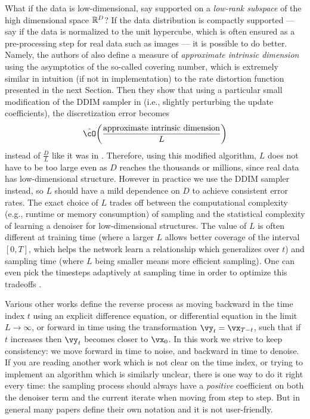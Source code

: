 \documentclass[../../book-main.tex]{subfiles}
\begin{document}
\begin{remark}
	What if the data is low-dimensional, say supported on a \textit{low-rank subspace} of the high dimensional space \(\mathbb{R}^{D}\)? If the data distribution is compactly supported --- say if the data is normalized to the unit hypercube, which is often ensured as a pre-processing step for real data such as images --- it is possible to do better. Namely, the authors of \cite{li2024d} also define a measure of \textit{approximate intrinsic dimension} using the asymptotics of the so-called covering number, which is extremely similar in intuition (if not in implementation) to the rate distortion function presented in the next Section. Then they show that using a particular small modification of the DDIM sampler in  (i.e., slightly perturbing the update coefficients), the discretization error becomes
	\begin{equation}
		\tilde{\cO}\rp{\frac{\text{approximate intrinsic dimension}}{L}}
	\end{equation}
	instead of \(\frac{D}{L}\) like it was in . Therefore, using this modified algorithm, \(L\) does not have to be too large even as \(D\) reaches the thousands or millions, since real data has low-dimensional structure. However in practice we use the DDIM sampler instead, so \(L\) should have a mild dependence on \(D\) to achieve consistent error rates. The exact choice of \(L\) trades off between the computational complexity (e.g., runtime or memory consumption) of sampling and the statistical complexity of learning a denoiser for low-dimensional structures. The value of \(L\) is often different at training time (where a larger \(L\) allows better coverage of the interval \([0, T]\), which helps the network learn a relationship which generalizes over \(t\)) and sampling time (where \(L\) being smaller means more efficient sampling). One can even pick the timesteps adaptively at sampling time in order to optimize this tradeoffs \cite{bao2022analytic}.
\end{remark}

\begin{remark}
	Various other works define the reverse process as moving backward in the time index \(t\) using an explicit difference equation, or differential equation in the limit \(L \to \infty\), or forward in time using the transformation \(\vy_{t} = \vx_{T - t}\), such that if \(t\) increases then \(\vy_{t}\) becomes closer to \(\vx_{0}\). In this work we strive to keep consistency: we move forward in time to noise, and backward in time to denoise. If you are reading another work which is not clear on the time index, or trying to implement an algorithm which is similarly unclear, there is one way to do it right every time: the sampling process should always have a \textit{positive} coefficient on both the denoiser term and the current iterate when moving from step to step. But in general many papers define their own notation and it is not user-friendly.
\end{remark}
\end{document}
